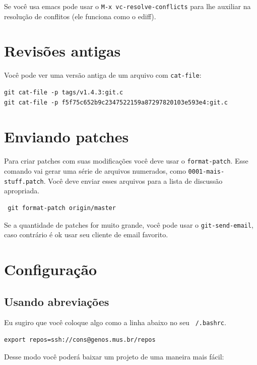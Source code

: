\documentclass[12pt,brazil]{book}
\begin{document}
Se você usa emacs pode usar o \texttt{M-x vc-resolve-conflicts} para
lhe auxiliar na resolução de conflitos (ele funciona como o ediff).

\section{Revisões antigas}
\label{sec:revisoes-antigas}

Você pode ver uma versão antiga de um arquivo com \texttt{cat-file}:

\begin{verbatim}
git cat-file -p tags/v1.4.3:git.c
git cat-file -p f5f75c652b9c2347522159a87297820103e593e4:git.c
\end{verbatim}

\section{Enviando patches}
\label{sec:enviando-patches}

Para criar patches com suas modificações você deve usar o
\texttt{format-patch}. Esse comando vai gerar uma série de arquivos
numerados, como \texttt{0001-mais-stuff.patch}. Você deve enviar esses
arquivos para a lista de discussão apropriada.

\begin{verbatim}
 git format-patch origin/master
\end{verbatim}

Se a quantidade de patches for muito grande, você pode usar o
\texttt{git-send-email}, caso contrário é ok usar seu cliente de email
favorito.

\section{Configuração}
\label{sec:configuracao}

\subsection{Usando abreviações}
\label{sec:usando-abreviacoes}

Eu sugiro que você coloque algo como a linha abaixo no seu
\texttt{~/.bashrc}.

\begin{verbatim}
export repos=ssh://cons@genos.mus.br/repos
\end{verbatim}

Desse modo você poderá baixar um projeto de uma maneira mais fácil:
\end{document}
